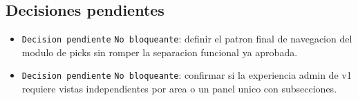 \subsection{Decisiones pendientes}

\begin{itemize}
  \item \texttt{Decision pendiente} \texttt{No bloqueante}: definir el patron final de navegacion del modulo de picks sin romper la separacion funcional ya aprobada.
  \item \texttt{Decision pendiente} \texttt{No bloqueante}: confirmar si la experiencia admin de v1 requiere vistas independientes por area o un panel unico con subsecciones.
\end{itemize}
